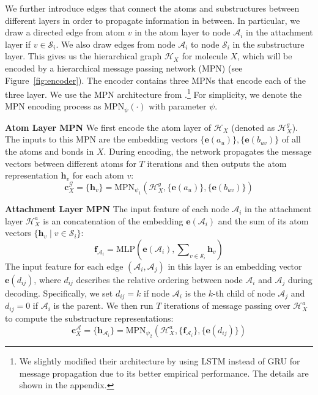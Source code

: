 \documentclass{article} \usepackage{iclr2020_conference,times}
\newcommand{\graph}{\mathcal{G}}
\newcommand{\MLP}{\mathrm{MLP}}
\newcommand{\MPN}{\mathrm{MPN}}
\newcommand{\set}[1]{\{ #1 \}}
\def\vc{{\bm{c}}}
\def\ve{{\bm{e}}}
\def\vf{{\bm{f}}}
\def\vh{{\bm{h}}}
\def\gA{{\mathcal{A}}}
\def\gH{{\mathcal{H}}}
\def\gS{{\mathcal{S}}}
\begin{document}
We further introduce edges that connect the atoms and substructures between different layers in order to propagate information in between. In particular, we draw a directed edge from atom $v$ in the atom layer to node $\gA_i$ in the attachment layer if $v \in \gS_i$. We also draw edges from node $\gA_i$ to node $\gS_i$ in the substructure layer. 
This gives us the hierarchical graph $\gH_X$ for molecule $X$, which will be encoded by a hierarchical message passing network (MPN) (see Figure~\ref{fig:encoder}). 
The encoder contains three MPNs that encode each of the three layer. We use the MPN architecture from \citet{jin2018learning}.\footnote{We slightly modified their architecture by using LSTM instead of GRU for message propagation due to its better empirical performance. The details are shown in the appendix.} For simplicity, we denote the MPN encoding process as $\MPN_\psi(\cdot)$ with parameter $\psi$.

\textbf{Atom Layer MPN } 
We first encode the atom layer of $\gH_X$ (denoted as $\gH_X^g$). The inputs to this MPN are the embedding vectors $\set{\ve(a_u)}, \set{\ve(b_{uv})}$ of all the atoms and bonds in $X$. During encoding, the network propagates the message vectors between different atoms for $T$ iterations and then outputs the atom representation $\vh_v$ for each atom $v$:
\begin{equation}
\vc_X^\graph = \set{\vh_v} = \MPN_{\psi_1}\left(\gH_X^g, \set{\ve(a_u)}, \set{\ve(b_{uv})} \right)
\end{equation}

\textbf{Attachment Layer MPN } 
The input feature of each node $\gA_i$ in the attachment layer $\gH_X^a$ is an concatenation of the embedding $\ve(\gA_i)$ and the sum of its atom vectors $\set{\vh_v \;|\; v \in \gS_i}$: 
\begin{equation}
\vf_{\gA_i} = \MLP\left( \ve(\gA_i), \sum\nolimits_{v \in \gS_i} \vh_v \right) 
\end{equation}
The input feature for each edge $(\gA_i, \gA_j)$ in this layer is an embedding vector $\ve(d_{ij})$, where $d_{ij}$ describes the relative ordering between node $\gA_i$ and $\gA_j$ during decoding. Specifically, we set $d_{ij}=k$ if node $\gA_i$ is the $k$-th child of node $\gA_j$ and $d_{ij}=0$ if $\gA_i$ is the parent. We then run $T$ iterations of message passing over $\gH_X^a$ to compute the substructure representations:
\begin{equation}
\vc_X^\gA = \set{\vh_{\gA_i}} = \MPN_{\psi_2}\left(\gH_X^a, \set{\vf_{\gA_i}}, \set{\ve(d_{ij})} \right)
\label{eq:mpn}
\end{equation}
\end{document}
